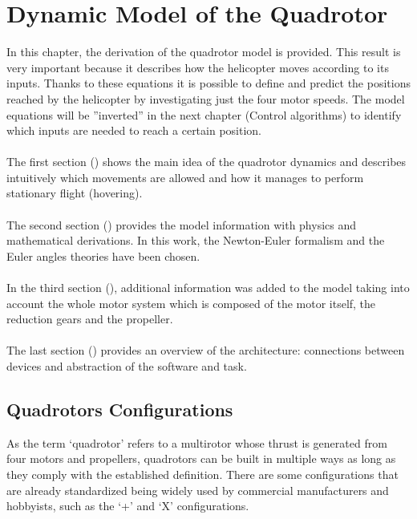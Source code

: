 \chapter{Dynamic Model of the Quadrotor \label{ch:model}}

In this chapter, the derivation of the quadrotor model is provided. This result
is very important because it describes how the helicopter moves according to its
inputs. Thanks to these equations it is possible to define and predict the positions
reached by the helicopter by investigating just the four motor speeds. The model
equations will be ”inverted” in the next chapter (Control algorithms) to identify
which inputs are needed to reach a certain position.
\\\\
The first section () shows the main idea of the quadrotor
dynamics and describes intuitively which movements are allowed and how it
manages to perform stationary flight (hovering).
\\\\
The second section () provides the model information
with physics and mathematical derivations. In this work, the Newton-Euler
formalism and the Euler angles theories have been chosen.
\\\\
In the third section (), additional information was added to
the model taking into account the whole motor system which is composed of the
motor itself, the reduction gears and the propeller.
\\\\
The last section () provides an overview of the architecture:
connections between devices and abstraction of the software and task.

\section{Quadrotors Configurations}
\label{sec:configurations}
As the term `quadrotor' refers to a multirotor whose thrust is generated from four motors and propellers, quadrotors can be built in multiple ways as long as they comply with the established definition. There are some configurations that are already standardized being widely used by commercial manufacturers and hobbyists, such as the `+' and `X' configurations.


